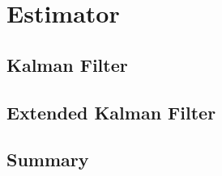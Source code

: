 \chapter{Estimator}
\label{chap:fourth}
\ifpdf
    \graphicspath{{Chapter4/Figures/PNG/}{Chapter4/Figures/PDF/}{Chapter4/Figures/}{Chapter4/Figures/EPS/}}
\else
    \graphicspath{{Chapter4/Figures/EPS/}{Chapter4/Figures/}}
\fi

\section{Kalman Filter}

\section{Extended Kalman Filter}


\section{Summary}